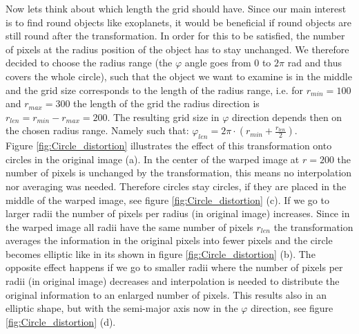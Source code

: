 Now lets think about which length the grid should have. Since our main interest is to find round objects like exoplanets, it would be beneficial if round objects are still round after the transformation. In order for this to be satisfied, the number of pixels at the radius position of the object has to stay unchanged. We therefore decided to choose the radius range (the $\varphi$ angle goes from $0$ to $2\pi$ rad and thus covers the whole circle), such that the object we want to examine is in the middle and the grid size corresponds to the length of the radius range, i.e. for $r_{min}=100$ and $r_{max}=300$ the length of the grid the radius direction is $r_{len}=r_{min}-r_{max}=200$. The resulting grid size in $\varphi$ direction depends then on the chosen radius range. Namely such that: $\varphi_{len} = 2\pi \cdot (r_{min}+\frac{r_{len}}{2})$.\\
Figure \ref{fig:Circle_distortion} illustrates the effect of this transformation onto circles in the original image (a). In the center of the warped image at $r=200$ the number of pixels is unchanged by the transformation, this means no interpolation nor averaging was needed. Therefore circles stay circles, if they are placed in the middle of the warped image, see figure \ref{fig:Circle_distortion} (c). If we go to larger radii the number of pixels per radius (in original image) increases. Since in the warped image all radii have the same number of pixels $r_{len}$ the transformation averages the information in the original pixels into fewer pixels and the circle becomes elliptic like in its shown in figure \ref{fig:Circle_distortion} (b). The opposite effect happens if we go to smaller radii where the number of pixels per radii (in original image) decreases and interpolation is needed to distribute the original information to an enlarged number of pixels. This results also in an elliptic shape, but with the semi-major axis now in the $\varphi$ direction, see figure \ref{fig:Circle_distortion} (d). 
